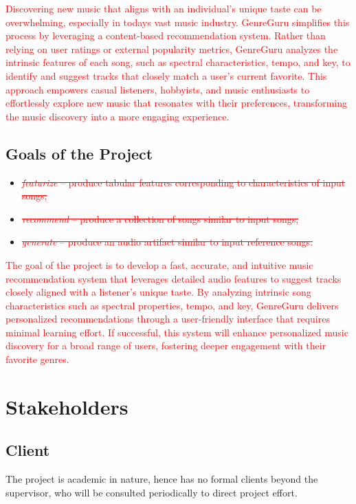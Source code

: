 \documentclass[12pt]{article}
\begin{document}
\textcolor{red}{Discovering new music that aligns with an individual's unique taste can be overwhelming, especially in todays vast music industry. 
GenreGuru simplifies this process by leveraging a content-based recommendation system. 
Rather than relying on user ratings or external popularity metrics, GenreGuru analyzes the intrinsic features of each song, 
such as spectral characteristics, tempo, and key, to identify and suggest tracks that closely match a user's current favorite. 
This approach empowers casual listeners, hobbyists, and music enthusiasts to effortlessly explore new music that resonates with their preferences, 
transforming the music discovery into a more engaging experience.}

\subsection{Goals of the Project}

\begin{itemize}
  \item \textcolor{red}{\sout{\emph{featurize} -- produce tabular features corresponding to characteristics of input songs;}}
  \item \textcolor{red}{\sout{\emph{recommend} -- produce a collection of songs similar to input songs;}}
  \item \textcolor{red}{\sout{\emph{generate} -- produce an audio artifact similar to input reference songs.}}  
\end{itemize}


\textcolor{red}{The goal of the project is to develop a fast, accurate, and intuitive music recommendation system that leverages detailed audio features to suggest 
tracks closely aligned with a listener’s unique taste. By analyzing intrinsic song characteristics such as spectral properties, tempo, and key, 
GenreGuru delivers personalized recommendations through a user-friendly interface that requires minimal learning effort. 
If successful, this system will enhance personalized music discovery for a broad range of users, fostering deeper engagement with their 
favorite genres.}

\section{Stakeholders}
\subsection{Client} \label{2.1-client}
The project is academic in nature, hence has no formal clients beyond the supervisor, who will be consulted periodically to direct project effort.
\end{document}
